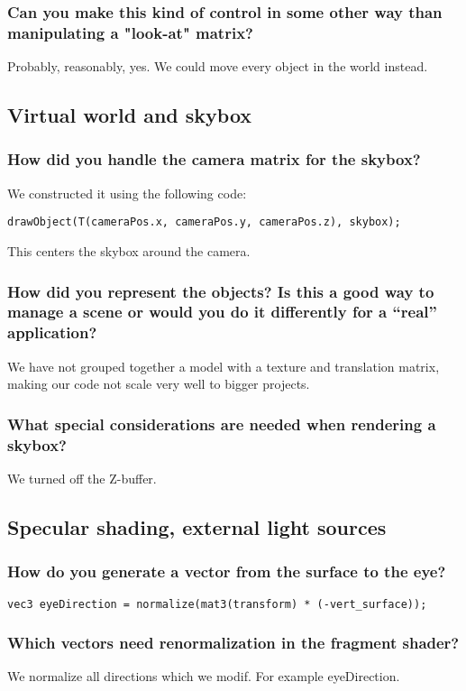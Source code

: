 \documentclass[a4paper,12pt]{article}
\begin{document}
\subsubsection{Can you make this kind of control in some other way
  than manipulating a "look-at" matrix?}
Probably, reasonably, yes. We could move every object in the world instead.

\subsection{Virtual world and skybox}
\subsubsection{How did you handle the camera matrix for the skybox?}
We constructed it using the following code:
\begin{lstlisting}[float,label=lst:cameramatrix,caption=nextHopInfo: Camera matrix code]
  	drawObject(T(cameraPos.x, cameraPos.y, cameraPos.z), skybox);
\end{lstlisting}
This centers the skybox around the camera.

\subsubsection{How did you represent the objects? Is this a good way to manage a scene or would you do it differently for a ``real'' application?}
We have not grouped together a model with a texture and translation matrix, making our code not scale very well to bigger projects.

\subsubsection{What special considerations are needed when rendering a skybox?}
We turned off the Z-buffer.

\subsection{Specular shading, external light sources}
\subsubsection{How do you generate a vector from the surface to the eye? }
\begin{lstlisting}[float,label=lst:label,caption=nextHopInfo: Surface to eye]
	vec3 eyeDirection = normalize(mat3(transform) * (-vert_surface));
\end{lstlisting}

\subsubsection{Which vectors need renormalization in the fragment shader? }
We normalize all directions which we modif. For example eyeDirection.
\end{document}
